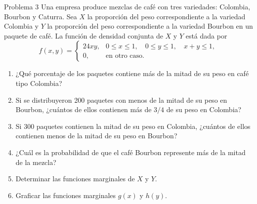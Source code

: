 \documentclass[11pt,letterpaper]{article}
\begin{document}
\begin{problema}{Problema 3}
Una empresa produce mezclas de café con tres variedades: Colombia, Bourbon y Caturra. Sea \(X\) la proporción del peso correspondiente a la variedad Colombia y \(Y\) la proporción del peso correspondiente a la variedad Bourbon en un paquete de café. La función de densidad conjunta de \(X\) y \(Y\) está dada por
\[
f(x,y)=
\begin{cases}
 24xy, & 0\leq x\leq1,\quad 0\leq y\leq1,\quad x+y\leq1,\\
 0, & \text{en otro caso}.
\end{cases}
\]

\begin{enumerate}
\item ¿Qué porcentaje de los paquetes contiene más de la mitad de su peso en café tipo Colombia?
\item Si se distribuyeron 200 paquetes con menos de la mitad de su peso en Bourbon, ¿cuántos de ellos contienen más de \(3/4\) de su peso en Colombia?
\item Si 300 paquetes contienen la mitad de su peso en Colombia, ¿cuántos de ellos contienen menos de la mitad de su peso en Bourbon?
\item ¿Cuál es la probabilidad de que el café Bourbon represente más de la mitad de la mezcla?
\item Determinar las funciones marginales de \(X\) y \(Y\).
\item Graficar las funciones marginales \(g(x)\) y \(h(y)\).
\end{enumerate}
\end{problema}
\end{document}
